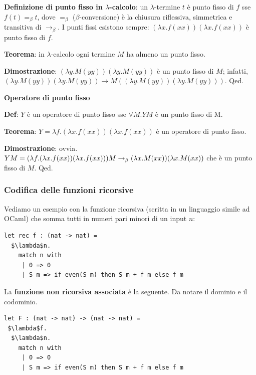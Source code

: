 \documentclass{article}
\begin{document}
\bigskip

\noindent \textbf{Definizione di punto fisso in $\lambda$-calcolo}: un $\lambda$-termine $t$ è {\color{red}punto fisso di $f$} sse $f(t) =_\beta t$, dove $=_\beta$ ($\beta$-conversione) è la chiusura riflessiva, simmetrica e transitiva di $\to_\beta$. I punti fissi esistono sempre: $(\lambda x.f(xx))(\lambda x.f(xx))$ è punto fisso di $f$.

\bigskip

\textbf{Teorema}: in $\lambda$-calcolo ogni termine $M$ ha almeno un punto fisso.

\textbf{Dimostrazione}: $(\lambda y.M(yy))(\lambda y.M(yy))$ è un punto fisso di $M$; infatti, $(\lambda y.M(yy))(\lambda y.M(yy)) \to M((\lambda y.M(yy))(\lambda y.M(yy)))$. Qed.

\bigskip
\bigskip

\noindent \textbf{Operatore di punto fisso}

\bigskip

\textbf{Def}: $Y$ è un operatore di punto fisso sse $\forall M.YM$ è un punto fisso di M.

\bigskip

\textbf{Teorema}: $Y = \lambda f.(\lambda x.f(xx))(\lambda x.f(xx))$ è un operatore di punto fisso.

\textbf{Dimostrazione}: ovvia. $YM = (\lambda f.(\lambda x.f(xx))(\lambda x.f(xx))) M \to_\beta \\ (\lambda x.M(xx))(\lambda x.M(xx))$ che è un punto fisso di $M$. Qed.

\subsubsection{Codifica delle funzioni ricorsive}
Vediamo un esempio con la funzione ricorsiva (scritta in un linguaggio simile ad OCaml) che somma tutti in numeri pari minori di un input $n$:
\begin{lstlisting}[mathescape=true]
let rec f : (nat -> nat) =
  $\lambda$n.
    match n with
     | 0 => 0
     | S m => if even(S m) then S m + f m else f m
\end{lstlisting}

\bigskip

La \textbf{funzione non ricorsiva associata} è la seguente. Da notare il dominio e il codominio.
\begin{lstlisting}[mathescape=true]
let F : (nat -> nat) -> (nat -> nat) =
 $\lambda$f.
  $\lambda$n.
    match n with
     | 0 => 0
     | S m => if even(S m) then S m + f m else f m
\end{lstlisting}
\end{document}
